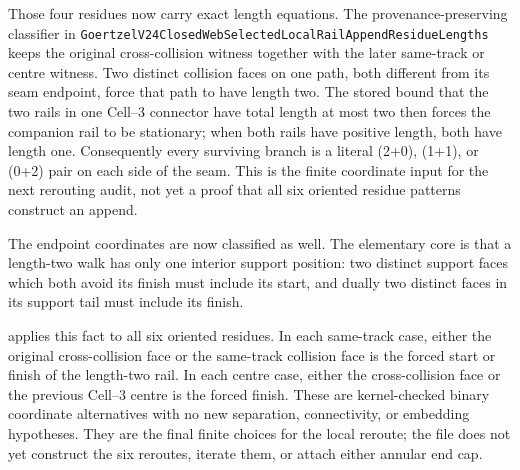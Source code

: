\documentclass[11pt]{article}
\theoremstyle{definition}
\begin{document}
Those four residues now carry exact length equations.  The
provenance-preserving classifier in
\texttt{GoertzelV24ClosedWebSelectedLocalRailAppendResidueLengths} keeps the
original cross-collision witness together with the later same-track or centre
witness.  Two distinct collision faces on one path, both different from its
seam endpoint, force that path to have length two.  The stored bound that the
two rails in one Cell--3 connector have total length at most two then forces
the companion rail to be stationary; when both rails have positive length,
both have length one.  Consequently every surviving branch is a literal
(2+0), (1+1), or (0+2) pair on each side of the seam.  This is the
finite coordinate input for the next rerouting audit, not yet a proof that
all six oriented residue patterns construct an append.

The endpoint coordinates are now classified as well.  The elementary core
is that a length-two walk has only one interior support position: two
distinct support faces which both avoid its finish must include its start,
and dually two distinct faces in its support tail must include its finish.

applies this fact to all six oriented residues.  In each same-track case,
either the original cross-collision face or the same-track collision face is
the forced start or finish of the length-two rail.  In each centre case,
either the cross-collision face or the previous Cell--3 centre is the forced
finish.  These are kernel-checked binary coordinate alternatives with no new
separation, connectivity, or embedding hypotheses.  They are the final
finite choices for the local reroute; the file does not yet construct the
six reroutes, iterate them, or attach either annular end cap.
\end{document}
